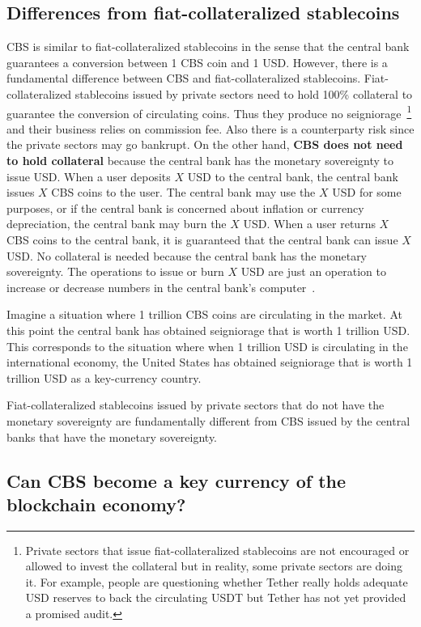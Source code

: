 \documentclass[dvipdfmx,a4paper]{article}
\begin{document}
\subsection{Differences from fiat-collateralized stablecoins}

CBS is similar to fiat-collateralized stablecoins in the sense that the central bank guarantees a conversion between 1 CBS coin and 1 USD. However, there is a fundamental difference between CBS and fiat-collateralized stablecoins. Fiat-collateralized stablecoins issued by private sectors need to hold 100\% collateral to guarantee the conversion of circulating coins. Thus they produce no seigniorage~\footnote{Private sectors that issue fiat-collateralized stablecoins are not encouraged or allowed to invest the collateral but in reality, some private sectors are doing it. For example, people are questioning whether Tether really holds adequate USD reserves to back the circulating USDT but Tether has not yet provided a promised audit.} and their business relies on commission fee. Also there is a counterparty risk since the private sectors may go bankrupt. On the other hand, \textbf{CBS does not need to hold collateral} because the central bank has the monetary sovereignty to issue USD. When a user deposits $X$ USD to the central bank, the central bank issues $X$ CBS coins to the user. The central bank may use the $X$ USD for some purposes, or if the central bank is concerned about inflation or currency depreciation, the central bank may burn the $X$ USD. When a user returns $X$ CBS coins to the central bank, it is guaranteed that the central bank can issue $X$ USD. No collateral is needed because the central bank has the monetary sovereignty. The operations to issue or burn $X$ USD are just an operation to increase or decrease numbers in the central bank's computer~\cite{mmt2016wray}.

Imagine a situation where 1 trillion CBS coins are circulating in the market. At this point the central bank has obtained seigniorage that is worth 1 trillion USD. This corresponds to the situation where when 1 trillion USD is circulating in the international economy, the United States has obtained seigniorage that is worth 1 trillion USD as a key-currency country.

Fiat-collateralized stablecoins issued by private sectors that do not have the monetary sovereignty are fundamentally different from CBS issued by the central banks that have the monetary sovereignty.

\subsection{Can CBS become a key currency of the blockchain economy?}
\end{document}
